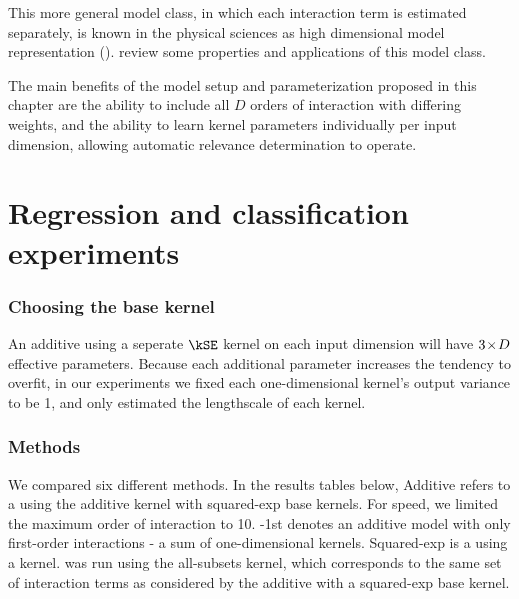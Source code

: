 This more general model class, in which each interaction term is estimated separately, is known in the physical sciences as high dimensional model representation (\HDMR{}).
\citet{rabitz1999general} review some properties and applications of this model class.

The main benefits of the model setup and parameterization proposed in this chapter are the ability to include all $D$ orders of interaction with differing weights, and the ability to learn kernel parameters individually per input dimension, allowing automatic relevance determination to operate.




\section{Regression and classification experiments}
\label{sec:additive-experiments}

\subsubsection{Choosing the base kernel}
An additive \gp{} using a seperate $\kSE$ kernel on each input dimension will have ${3 \! \times \! D}$ effective parameters.
Because each additional parameter increases the tendency to overfit, %
%
%
in our experiments we fixed each one-dimensional kernel's output variance to be 1, and only estimated the lengthscale of each kernel.



\subsubsection{Methods}

We compared six different methods.
In the results tables below, \gp{} Additive refers to a \gp{} using the additive kernel with squared-exp base kernels.
For speed, we limited the maximum order of interaction to 10.
\gp{}-1st denotes an additive \gp{} model with only first-order interactions - a sum of one-dimensional kernels.
\gp{} Squared-exp is a \gp{} using a \seard{} kernel.
\HKL{} was run using the all-subsets kernel, which corresponds to the same set of interaction terms as considered by the additive \gp{} with a squared-exp base kernel.

